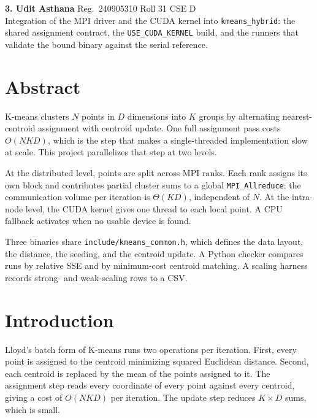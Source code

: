 \documentclass[12pt,a4paper]{article}
\DeclareRobustCommand{\code}[1]{\texttt{#1}}
\DeclareRobustCommand{\file}[1]{\texttt{#1}}
\begin{document}
\vspace{0.45em}
\noindent\textbf{3. Udit Asthana} \quad Reg.\ 240905310 \quad Roll 31 \quad CSE D\\
Integration of the MPI driver and the CUDA kernel into \code{kmeans\_hybrid}: the shared assignment contract, the \code{USE\_CUDA\_KERNEL} build, and the runners that validate the bound binary against the serial reference.

\tableofcontents

\section{Abstract}
\label{sec:abstract}

K-means clusters $N$ points in $D$ dimensions into $K$ groups by alternating nearest-centroid assignment with centroid update. One full assignment pass costs $O(NKD)$, which is the step that makes a single-threaded implementation slow at scale. This project parallelizes that step at two levels.

At the distributed level, points are split across MPI ranks. Each rank assigns its own block and contributes partial cluster sums to a global \code{MPI\_Allreduce}; the communication volume per iteration is $\Theta(KD)$, independent of $N$. At the intra-node level, the CUDA kernel gives one thread to each local point. A CPU fallback activates when no usable device is found.

Three binaries share \file{include/kmeans\_common.h}, which defines the data layout, the distance, the seeding, and the centroid update. A Python checker compares runs by relative SSE and by minimum-cost centroid matching. A scaling harness records strong- and weak-scaling rows to a CSV.

\section{Introduction}
\label{sec:intro}

Lloyd's batch form of K-means \cite{lloyd1982,macqueen1967} runs two operations per iteration. First, every point is assigned to the centroid minimizing squared Euclidean distance. Second, each centroid is replaced by the mean of the points assigned to it. The assignment step reads every coordinate of every point against every centroid, giving a cost of $O(NKD)$ per iteration. The update step reduces $K \times D$ sums, which is small.
\end{document}
